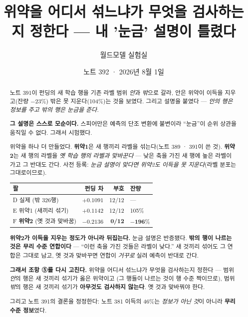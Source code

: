 \documentclass[11pt]{article}
\begin{document}
\title{위약을 어디서 섞느냐가 무엇을 검사하는지 정한다 --- 내 '눈금' 설명이 틀렸다}
\author{월드모델 실험실}
\date{노트 392 · 2026년 8월 1일}
\maketitle

\begin{abstract}
노트 391이 펀딩의 새 학습 행을 기존 라벨 범위 \emph{안}과 \emph{밖}으로
갈라, 안은 위약이 이득을 지우고(잔량 $-23$\%) 밖은 못 지운다(104\%)는 것을
보였다. 그리고 설명을 붙였다 --- \emph{안의 행은 정보를 주고 밖의 행은
눈금을 준다.}

\textbf{그 설명은 스스로 모순이다.} 스피어만은 예측의 단조 변환에 불변이라
``눈금''이 순위 상관을 움직일 수 없다. 그래서 시험했다.

위약을 하나 더 만들었다. \textbf{위약1}은 새 행끼리 라벨을 섞는다(노트
389 · 391이 쓴 것). \textbf{위약2}는 새 행의 라벨을 \emph{옛 학습 행의
라벨과 맞바꾼다} --- 낮은 축을 가진 새 행에 높은 라벨이 가고 그 반대도
간다. 사전 등록: \emph{눈금 설명이 맞다면 위약2도 이득을 못 지운다}(라벨
분포는 그대로이므로).

\begin{center}
\begin{tabular}{lrrl}
\hline
팔 & 펀딩 차 & 부호 & 잔량 \\
\hline
D 실제 (밖 326행) & $+0.1091$ & 12/12 & --- \\
E 위약1 (새끼리 섞기) & $+0.1142$ & 12/12 & 105\% \\
F \textbf{위약2} (옛 것과 맞바꿈) & $\mathbf{-0.2136}$ & \textbf{0/12} & $\mathbf{-196\%}$ \\
\hline
\end{tabular}
\end{center}

\textbf{위약2가 이득을 지우는 정도가 아니라 뒤집는다.} 눈금 설명은
반증됐다. \textbf{밖의 행이 나르는 것은 무리 수준 연합이다} --- ``이런
축을 가진 것들은 라벨이 낮다.'' 새 것끼리 섞어도 그 연합은 그대로 남고,
옛 것과 맞바꾸면 연합이 \emph{거꾸로} 실려 예측이 반대로 간다.

\textbf{그래서 조항 ⑤를 다시 고친다.} 위약을 어디서 섞느냐가 무엇을
검사하는지 정한다 --- 범위 \emph{안}의 행은 새 것끼리 섞기가 옳은 위약이고
(그 행들이 나르는 것이 행 수준 짝이므로), 범위 \emph{밖}의 행은 새 것끼리
섞기가 \textbf{아무것도 검사하지 않는다}. 옛 것과 맞바꿔야 한다.

그리고 노트 391의 결론을 정정한다: 노트 381 이득의 46\%는 \emph{정보가
아닌 것}이 아니라 \textbf{무리 수준 정보}였다.
\end{abstract}
\end{document}

